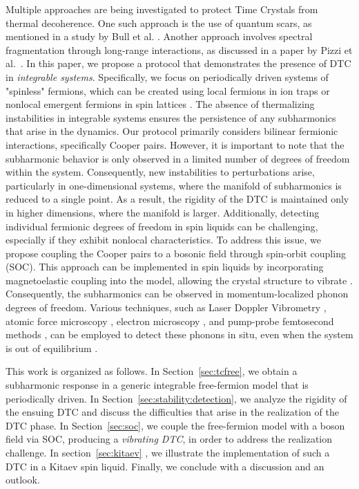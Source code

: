 \documentclass[preprint,5p,times,twocolumn]{elsarticle}
\begin{document}
Multiple approaches are being investigated to protect Time Crystals from thermal decoherence. One such approach is the use of quantum scars, as mentioned in a study by Bull et al. \citep{PhysRevLett.129.140602}. Another approach involves spectral fragmentation through long-range interactions, as discussed in a paper by Pizzi et al.~\citep{Pizzi2021}. In this paper, we propose a protocol that demonstrates the presence of DTC in \emph{integrable systems}. Specifically, we focus on periodically driven systems of "spinless" fermions, which can be created using local fermions in ion traps \citep{Zhang2018} or nonlocal emergent fermions in spin lattices \citep{mbeng_quantum_2020, Chen_2008}. The absence of thermalizing instabilities in integrable systems ensures the persistence of any subharmonics that arise in the dynamics. Our protocol primarily considers bilinear fermionic interactions, specifically Cooper pairs. However, it is important to note that the subharmonic behavior is only observed in a limited number of degrees of freedom within the system. Consequently, new instabilities to perturbations arise, particularly in one-dimensional systems, where the manifold of subharmonics is reduced to a single point. As a result, the rigidity of the DTC is maintained only in higher dimensions, where the manifold is larger. Additionally, detecting individual fermionic degrees of freedom in spin liquids can be challenging, especially if they exhibit nonlocal characteristics. To address this issue, we propose coupling the Cooper pairs to a bosonic field through spin-orbit coupling (SOC). This approach can be implemented in spin liquids by incorporating magnetoelastic coupling into the model, allowing the crystal structure to vibrate \citep{soc:dixon, fiete:phonons}. Consequently, the subharmonics can be observed in momentum-localized phonon degrees of freedom. Various techniques, such as Laser Doppler Vibrometry \citep{doppler:phonons}, atomic force microscopy \citep{Jahng2023}, electron microscopy \citep{Gadre2022}, and pump-probe femtosecond methods \citep{matsuda_fundamentals_2015,Ruello2015-qx}, can be employed to detect these phonons in situ, even when the system is out of equilibrium \citep{ng_excitation_2022}.

This work is organized as follows. In Section~\ref{sec:tcfree}, we obtain a subharmonic response in a generic integrable free-fermion model that is periodically driven. In Section~\ref{sec:stability:detection}, we analyze the rigidity of the ensuing DTC and discuss the difficulties that arise in the realization of the DTC phase. In Section~\ref{sec:soc}, we couple the free-fermion model with a boson field via SOC, producing a \emph{vibrating DTC}, in order to address the realization challenge. In section~\ref{sec:kitaev} , we illustrate the implementation of such a DTC in a Kitaev spin liquid. Finally, we conclude with a discussion and an outlook.
\end{document}
